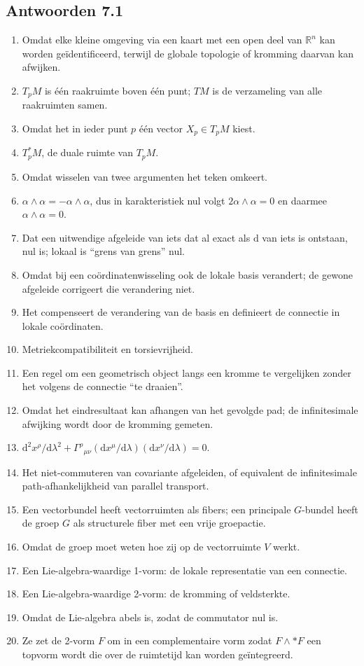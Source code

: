 \documentclass[11pt,a4paper]{article}
\newcommand{\dd}{\mathrm{d}}
\newcommand{\R}{\mathbb{R}}
\begin{document}
\subsection*{Antwoorden 7.1}
\begin{enumerate}
\item Omdat elke kleine omgeving via een kaart met een open deel van $\R^n$ kan worden geïdentificeerd, terwijl de globale topologie of kromming daarvan kan afwijken.
\item $T_pM$ is één raakruimte boven één punt; $TM$ is de verzameling van alle raakruimten samen.
\item Omdat het in ieder punt $p$ één vector $X_p\in T_pM$ kiest.
\item $T_p^*M$, de duale ruimte van $T_pM$.
\item Omdat wisselen van twee argumenten het teken omkeert.
\item $\alpha\wedge\alpha=-\alpha\wedge\alpha$, dus in karakteristiek nul volgt $2\alpha\wedge\alpha=0$ en daarmee $\alpha\wedge\alpha=0$.
\item Dat een uitwendige afgeleide van iets dat al exact als $\dd$ van iets is ontstaan, nul is; lokaal is ``grens van grens'' nul.
\item Omdat bij een coördinatenwisseling ook de lokale basis verandert; de gewone afgeleide corrigeert die verandering niet.
\item Het compenseert de verandering van de basis en definieert de connectie in lokale coördinaten.
\item Metriekcompatibiliteit en torsievrijheid.
\item Een regel om een geometrisch object langs een kromme te vergelijken zonder het volgens de connectie ``te draaien''.
\item Omdat het eindresultaat kan afhangen van het gevolgde pad; de infinitesimale afwijking wordt door de kromming gemeten.
\item $\dd^2x^\rho/\dd\lambda^2+\Gamma^\rho{}_{\mu\nu}(\dd x^\mu/\dd\lambda)(\dd x^\nu/\dd\lambda)=0$.
\item Het niet-commuteren van covariante afgeleiden, of equivalent de infinitesimale path-afhankelijkheid van parallel transport.
\item Een vectorbundel heeft vectorruimten als fibers; een principale $G$-bundel heeft de groep $G$ als structurele fiber met een vrije groepactie.
\item Omdat de groep moet weten hoe zij op de vectorruimte $V$ werkt.
\item Een Lie-algebra-waardige 1-vorm: de lokale representatie van een connectie.
\item Een Lie-algebra-waardige 2-vorm: de kromming of veldsterkte.
\item Omdat de Lie-algebra abels is, zodat de commutator nul is.
\item Ze zet de 2-vorm $F$ om in een complementaire vorm zodat $F\wedge *F$ een topvorm wordt die over de ruimtetijd kan worden geïntegreerd.
\end{enumerate}
\end{document}
